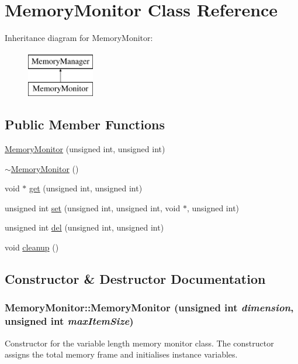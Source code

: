 \hypertarget{classMemoryMonitor}{
\section{MemoryMonitor Class Reference}
\label{classMemoryMonitor}
}
Inheritance diagram for MemoryMonitor:\begin{figure}[H]
\begin{center}
\leavevmode
\includegraphics[height=2cm]{classMemoryMonitor}
\end{center}
\end{figure}
\subsection*{Public Member Functions}
\begin{DoxyCompactItemize}
\item 
\hyperlink{classMemoryMonitor_aeb8654aa2a992f8cbbb782352a413d34}{MemoryMonitor} (unsigned int, unsigned int)
\item 
\hyperlink{classMemoryMonitor_a0286650da6c61e8c37bb7b8238f9b08b}{$\sim$MemoryMonitor} ()
\item 
void $\ast$ \hyperlink{classMemoryMonitor_a547ef93f8d1664f7f4a5c41f4a922caa}{get} (unsigned int, unsigned int)
\item 
unsigned int \hyperlink{classMemoryMonitor_a57b86aac696c79f2c3018ee9878e15a3}{set} (unsigned int, unsigned int, void $\ast$, unsigned int)
\item 
unsigned int \hyperlink{classMemoryMonitor_a6ebe27bc008fb68397d9f400c0745c5d}{del} (unsigned int, unsigned int)
\item 
void \hyperlink{classMemoryMonitor_ac31e19cbcae35d0fb865c3380f355e37}{cleanup} ()
\end{DoxyCompactItemize}


\subsection{Constructor \& Destructor Documentation}
\hypertarget{classMemoryMonitor_aeb8654aa2a992f8cbbb782352a413d34}{
\subsubsection[{MemoryMonitor}]{\setlength{\rightskip}{0pt plus 5cm}MemoryMonitor::MemoryMonitor (unsigned int {\em dimension}, \/  unsigned int {\em maxItemSize})}}
\label{classMemoryMonitor_aeb8654aa2a992f8cbbb782352a413d34}
Constructor for the variable length memory monitor class. The constructor assigns the total memory frame and initialises instance variables.



